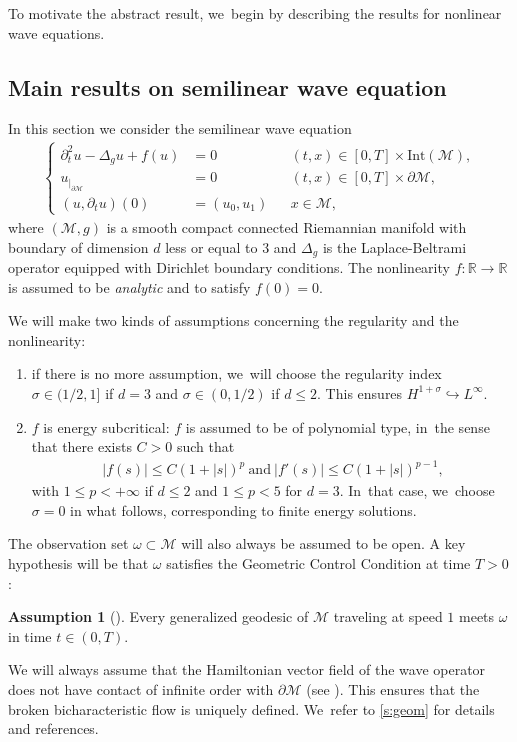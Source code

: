 \documentclass[10pt]{amsart}
\theoremstyle{definition}
\newtheorem{assum}{Assumption}
\newenvironment{assump}[2][]
{\renewcommand\theassum{#2}\begin{assum}[#1]}
{\end{assum}}
\let\mc\mathcal
\newcommand{\M}{\mc{M}}
\newcommand{\R}{\mathbb{R}}
\begin{document}
To motivate the abstract result, we~begin by describing the results for nonlinear wave equations.

\subsection{Main results on semilinear wave equation}\label{s:waveIntro} In this section we consider the semilinear wave equation
\begin{align}\label{eq:nlw-1}
\left\{\begin{aligned}
\partial_t^2 u-\Delta_g u+f(u)&=0 &&(t, x)\in [0, T]\times \text{Int}(\M),\\
u_{|_{\partial\M}}&=0 &&(t, x)\in [0, T]\times\partial\M,\\
(u, \partial_t u)(0)&=(u_0, u_1) && x\in \M,
\end{aligned}\right.
\end{align}
where $(\M, g)$ is a smooth compact connected Riemannian manifold with boundary of dimension $d$ less or equal to $3$ and $\Delta_g$ is the Laplace-Beltrami operator equipped with Dirichlet boundary conditions. The nonlinearity $f: \R\to \R$ is assumed to be \emph{analytic} and to satisfy $f(0)=0$.

We will make two kinds of assumptions concerning the regularity and the nonlinearity:
\begin{enumerate}
\item if there is no more assumption, we~will choose the regularity index $\sigma\in (1/2,1]$ if $d=3$ and $\sigma\in (0,1/2)$ if $d\leq 2$. This ensures $H^{1+\sigma}\hookrightarrow L^{\infty}$.
\item $f$ is energy subcritical: $f$ is assumed to be of polynomial type, in~the sense that there exists $C>0$ such that
\begin{align}\label{hip:nonlinearity-hyp-1}
\ |f(s)|\leq C(1+|s|)^p\ \text{and}\ |f'(s)|\leq C(1+|s|)^{p-1},
\end{align}
with $1\leq p<+\infty$ if $d\leq 2$ and $1\leq p<5$ for $d=3$. In~that case, we~choose $\sigma=0$ in what follows, corresponding to finite energy solutions.
\end{enumerate}

The observation set $\omega\subset \M$ will also always be assumed to be open. A key hypothesis will be that $\omega$ satisfies the Geometric Control Condition at time $T>0$:
\begin{assump}{GCC}\label{assumGCC}
Every generalized geodesic of $\M$ traveling at speed $1$ meets $\omega$ in time $t\in (0, T)$.
\end{assump}
We will always assume that the Hamiltonian vector field of the wave operator does not have contact of infinite order with $\partial \M$ (see \cite{MS:78}). This ensures that the broken bicharacteristic flow is uniquely defined. We~refer to \cref{s:geom} for details and references.
\end{document}
